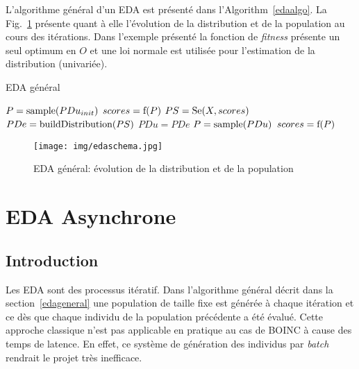 \documentclass[a4paper, 11pt]{report}
\begin{document}
L'algorithme général d'un EDA est présenté dans l'Algorithm~\ref{edaalgo}. La Fig.~\ref{edaschema} présente quant à elle l'évolution de la distribution et de la population au cours des itérations. Dans l'exemple présenté la fonction de \textit{fitness} présente un seul optimum en $O$ et une loi normale est utilisée pour l'estimation de la distribution (univariée).

\begin{algorithm}                      
\caption{EDA général}          
\label{edaalgo}                           
\begin{algorithmic}                    
\STATE $P = \textnormal{sample}(PDu_{init})$ 
\STATE $scores = \textnormal{f}(P)$ 
\STATE $PS = \textnormal{Se}(X, scores)$ 
\STATE $PDe = \textnormal{buildDistribution}(PS)$ 
\STATE $PDu = PDe$
\STATE $P = \textnormal{sample}(PDu)$ 
\STATE $scores = \textnormal{f}(P)$ 
\ENDWHILE
\end{algorithmic}
\end{algorithm}

\begin{figure}[!h]
\centering
\texttt{[image: img/edaschema.jpg]}
\caption{EDA général: évolution de la distribution et de la population~\cite{WIKI_EDA}}
\label{edaschema}
\end{figure}






\section{EDA Asynchrone}

\subsection{Introduction}
Les EDA sont des processus itératif. Dans l'algorithme général décrit dans la section~\ref{edageneral} une population de taille fixe est générée à chaque itération et ce dès que chaque individu de la population précédente a été évalué. Cette approche classique n'est pas applicable en pratique au cas de \textsc{BOINC} à cause des temps de latence. En effet, ce système de génération des individus par \textit{batch} rendrait le projet très inefficace.
\end{document}

